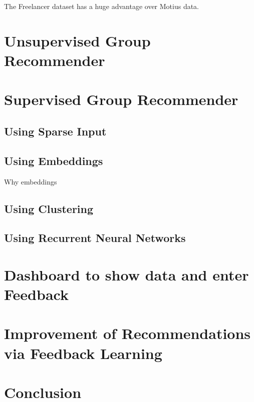 The Freelancer dataset has a huge advantage over Motius data.

\section{Unsupervised Group Recommender}

\section{Supervised Group Recommender}

\subsection{Using Sparse Input}

\subsection{Using Embeddings}

Why embeddings

\subsection{Using Clustering}

\subsection{Using Recurrent Neural Networks}

\section{Dashboard to show data and enter Feedback}

\section{Improvement of Recommendations via Feedback Learning}

\section{Conclusion}
